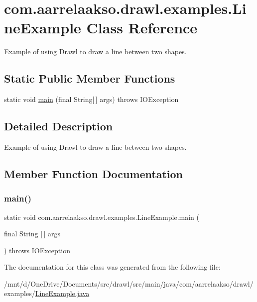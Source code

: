\hypertarget{classcom_1_1aarrelaakso_1_1drawl_1_1examples_1_1_line_example}{}\section{com.\+aarrelaakso.\+drawl.\+examples.\+Line\+Example Class Reference}
\label{classcom_1_1aarrelaakso_1_1drawl_1_1examples_1_1_line_example}


Example of using Drawl to draw a line between two shapes.  


\subsection*{Static Public Member Functions}
\begin{DoxyCompactItemize}
\item 
static void \hyperlink{classcom_1_1aarrelaakso_1_1drawl_1_1examples_1_1_line_example_a2e44cc23cd7863a19e87313fa4d7f6c3}{main} (final String\mbox{[}$\,$\mbox{]} args)  throws I\+O\+Exception     
\end{DoxyCompactItemize}


\subsection{Detailed Description}
Example of using Drawl to draw a line between two shapes. 

\subsection{Member Function Documentation}
\mbox{\label{classcom_1_1aarrelaakso_1_1drawl_1_1examples_1_1_line_example_a2e44cc23cd7863a19e87313fa4d7f6c3}} 
\subsubsection{\texorpdfstring{main()}{main()}}
{\footnotesize\ttfamily static void com.\+aarrelaakso.\+drawl.\+examples.\+Line\+Example.\+main (\begin{DoxyParamCaption}\item[{final String \mbox{[}$\,$\mbox{]}}]{args }\end{DoxyParamCaption}) throws I\+O\+Exception\hspace{0.3cm}{\ttfamily [static]}}



The documentation for this class was generated from the following file\+:\begin{DoxyCompactItemize}
\item 
/mnt/d/\+One\+Drive/\+Documents/src/drawl/src/main/java/com/aarrelaakso/drawl/examples/\hyperlink{_line_example_8java}{Line\+Example.\+java}\end{DoxyCompactItemize}
